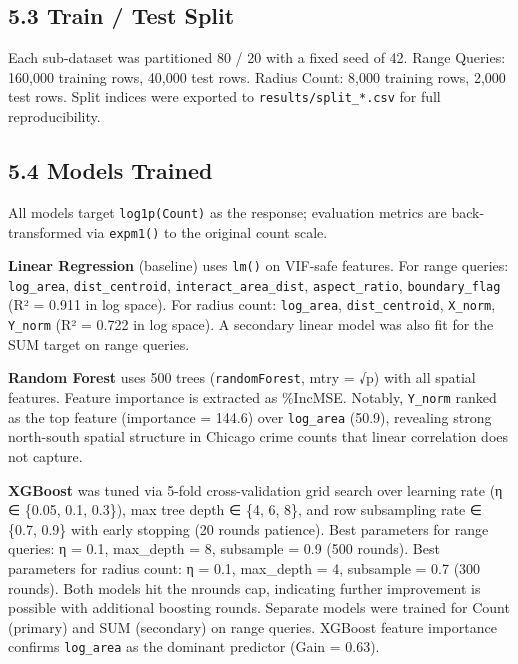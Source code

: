 \documentclass[
  10pt,
  twocolumn,
  10pt]{article}
\begin{document}
\subsection{5.3 Train / Test Split}\label{train-test-split}

Each sub-dataset was partitioned 80 / 20 with a fixed seed of 42. Range
Queries: 160,000 training rows, 40,000 test rows. Radius Count: 8,000
training rows, 2,000 test rows. Split indices were exported to
\texttt{results/split\_*.csv} for full reproducibility.

\subsection{5.4 Models Trained}\label{models-trained}

All models target \texttt{log1p(Count)} as the response; evaluation
metrics are back-transformed via \texttt{expm1()} to the original count
scale.

\textbf{Linear Regression} (baseline) uses \texttt{lm()} on VIF-safe
features. For range queries: \texttt{log\_area},
\texttt{dist\_centroid}, \texttt{interact\_area\_dist},
\texttt{aspect\_ratio}, \texttt{boundary\_flag} (R² = 0.911 in log
space). For radius count: \texttt{log\_area}, \texttt{dist\_centroid},
\texttt{X\_norm}, \texttt{Y\_norm} (R² = 0.722 in log space). A
secondary linear model was also fit for the SUM target on range queries.

\textbf{Random Forest} uses 500 trees (\texttt{randomForest}, mtry = √p)
with all spatial features. Feature importance is extracted as \%IncMSE.
Notably, \texttt{Y\_norm} ranked as the top feature (importance = 144.6)
over \texttt{log\_area} (50.9), revealing strong north-south spatial
structure in Chicago crime counts that linear correlation does not
capture.

\textbf{XGBoost} was tuned via 5-fold cross-validation grid search over
learning rate (η ∈ \{0.05, 0.1, 0.3\}), max tree depth ∈ \{4, 6, 8\},
and row subsampling rate ∈ \{0.7, 0.9\} with early stopping (20 rounds
patience). Best parameters for range queries: η = 0.1, max\_depth = 8,
subsample = 0.9 (500 rounds). Best parameters for radius count: η = 0.1,
max\_depth = 4, subsample = 0.7 (300 rounds). Both models hit the
nrounds cap, indicating further improvement is possible with additional
boosting rounds. Separate models were trained for Count (primary) and
SUM (secondary) on range queries. XGBoost feature importance confirms
\texttt{log\_area} as the dominant predictor (Gain = 0.63).
\end{document}
